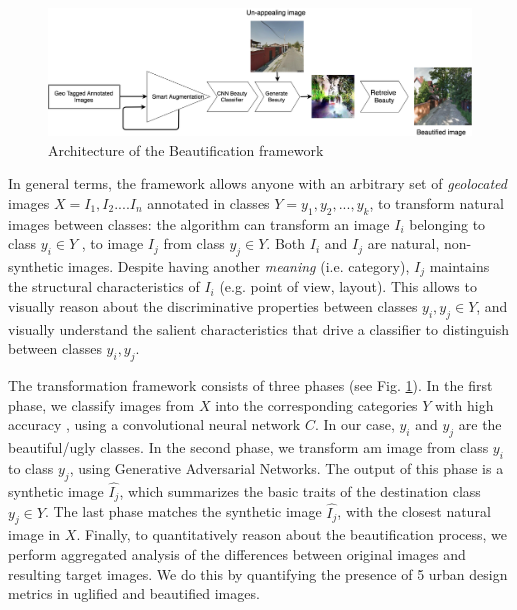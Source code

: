  \begin{figure}[ht]
	\centering
	\includegraphics[width=2\columnwidth]{Plot/UrbanEmotionspipeline.png}
	\caption{Architecture of the Beautification framework}
	\label{fig:framework}
\end{figure}

In general terms, the framework allows anyone with an arbitrary set of \emph{geolocated} images $ X = { I_1, I_2 ... . I_n  }$ annotated in classes $Y = {y_1 , y_2 , ... ,y_k}$, to transform natural images between classes: the algorithm can transform an  image $I_i$ belonging to class $y_i \in Y$ , to image $I_j$ from class $y_j \in Y$. Both $I_i$ and $I_j$ are natural, non-synthetic images. Despite having another \emph{meaning} (i.e. category), $I_j$ maintains the structural characteristics of $I_i$ (e.g. point of view, layout).  This allows  to visually reason about the discriminative properties between classes $y_i , y_j \in Y$, and visually understand the salient characteristics that drive a classifier to distinguish between  classes $y_i,y_j$. %
\par 
The transformation framework consists of three phases (see Fig. \ref{fig:framework}). In the first phase, we classify images from $X$ into the corresponding categories $Y$ with high accuracy , using a convolutional neural network $C$. In our case, $y_i$  and  $y_j$ are the beautiful/ugly classes.
In the second phase, we transform am image from class $y_i$ to class $y_j$, using Generative Adversarial Networks\cite{radford2015unsupervised}. The output of this phase is a synthetic image $\hat{I_j}$, which summarizes the basic traits of the destination class $y_j \in Y$. The last phase matches the synthetic image $\hat{I_j}$,  with the closest natural image in $X$. Finally, to quantitatively reason about the beautification process, we perform aggregated analysis of the differences between original images and resulting target images.%
We do this by quantifying the presence of 5 urban design metrics in uglified and beautified images.

